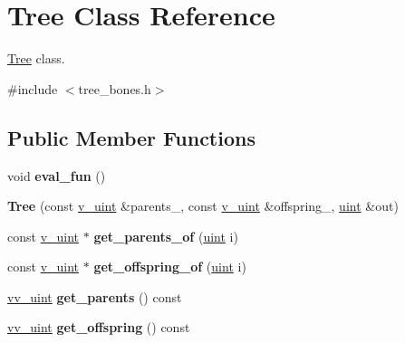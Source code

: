 \hypertarget{classTree}{}\section{Tree Class Reference}
\label{classTree}


\hyperlink{classTree}{Tree} class.  




{\ttfamily \#include $<$tree\+\_\+bones.\+h$>$}

\subsection*{Public Member Functions}
\begin{DoxyCompactItemize}
\item 
void {\bfseries eval\+\_\+fun} ()\hypertarget{classTree_a5a24565d179a3bd6edae1ff323060a93}{}\label{classTree_a5a24565d179a3bd6edae1ff323060a93}

\item 
{\bfseries Tree} (const \hyperlink{typedefs_8h_ad56dde311aef1af823f4351451e8a381}{v\+\_\+uint} \&parents\+\_\+, const \hyperlink{typedefs_8h_ad56dde311aef1af823f4351451e8a381}{v\+\_\+uint} \&offspring\+\_\+, \hyperlink{typedefs_8h_a91ad9478d81a7aaf2593e8d9c3d06a14}{uint} \&out)\hypertarget{classTree_a0f964d9ba9834822d3e18946a5361839}{}\label{classTree_a0f964d9ba9834822d3e18946a5361839}

\item 
const \hyperlink{typedefs_8h_ad56dde311aef1af823f4351451e8a381}{v\+\_\+uint} $\ast$ {\bfseries get\+\_\+parents\+\_\+of} (\hyperlink{typedefs_8h_a91ad9478d81a7aaf2593e8d9c3d06a14}{uint} i)\hypertarget{classTree_adb9bede67bc875b58bb240d4c5421821}{}\label{classTree_adb9bede67bc875b58bb240d4c5421821}

\item 
const \hyperlink{typedefs_8h_ad56dde311aef1af823f4351451e8a381}{v\+\_\+uint} $\ast$ {\bfseries get\+\_\+offspring\+\_\+of} (\hyperlink{typedefs_8h_a91ad9478d81a7aaf2593e8d9c3d06a14}{uint} i)\hypertarget{classTree_a02c43c8a0bb0e7be7bf33436a8c05b30}{}\label{classTree_a02c43c8a0bb0e7be7bf33436a8c05b30}

\item 
\hyperlink{typedefs_8h_a889a1eb698faf8cdf9160d65a20d316d}{vv\+\_\+uint} {\bfseries get\+\_\+parents} () const \hypertarget{classTree_ae4f36e6d306946015965a7d9bc577a2a}{}\label{classTree_ae4f36e6d306946015965a7d9bc577a2a}

\item 
\hyperlink{typedefs_8h_a889a1eb698faf8cdf9160d65a20d316d}{vv\+\_\+uint} {\bfseries get\+\_\+offspring} () const \hypertarget{classTree_af8780369e1bc3a0d4e396bb91ad85a72}{}\label{classTree_af8780369e1bc3a0d4e396bb91ad85a72}


\end{DoxyCompactItemize}
